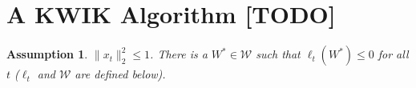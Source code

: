 \documentclass{article}
\newcommand{\e}{\mathbf{e}}
\newtheorem{assumption}{Assumption}
\DeclareMathOperator*{\argmax}{\arg\!\max}
\begin{document}



\section{A KWIK Algorithm {\color{red} [TODO]}}
\label{sec:kwik}
\begin{assumption}
$\|x_t\|_2^2\leq 1$. There is a $W^*\in\mathcal{W}$ such that $\ell_t(W^*)\leq 0$ for all $t$ ($\ell_t$ and $\mathcal{W}$ are defined below).  
\end{assumption}
\end{document}
